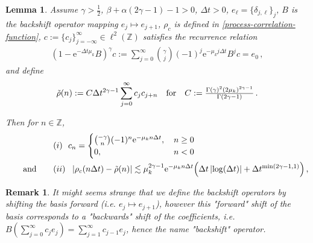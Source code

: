 \documentclass[12pt]{article} %
\newcommand{\abs}[1]{\left| #1 \right|}
\newtheorem{lemma}[theorem]{Lemma}
\newtheorem{remark}{Remark}
\begin{document}
\begin{lemma} \label{lem:toy-model-convergence}  Assume $\gamma>\tfrac12$, $\beta + \alpha (2 \gamma - 1) - 1 > 0$, $\Delta t>0$, %
$e_\ell = \{\delta_{j,\ell}\}_j$, $B$ is the backshift operator mapping $e_j \mapsto e_{j + 1}$, $\rho_c$ is  
defined in \eqref{process-correlation-function}, $c := \{c_j\}_{j = -\infty}^\infty \in \ell^2(\mathbb{Z})$ satisfies the recurrence relation 
\begin{align*}(1 - \mathrm{e}^{-\Delta t \mu_k} B)^{\gamma} c := \sum_{j = 0}^\infty \binom{\gamma}{j} (-1)^j \mathrm{e}^{-\mu_k j\Delta t } B^j c=e_0 \, ,
\end{align*}
and define
\begin{align*}
\Tilde{\rho}(n) := C \Delta t^{2\gamma - 1} \sum_{j = 0}^\infty c_j c_{j + n} \quad \text{for}\quad C := \tfrac{\Gamma(\gamma)^2 (2 \mu_k)^{2 \gamma - 1}}{\Gamma(2 \gamma - 1)}\, .
\end{align*}

Then for $n\in\mathbb Z$,
\begin{align*}
& \qquad (i) \ \ c_n = \begin{cases} \binom{-\gamma}{n} (-1)^n \mathrm{e}^{-\mu_k n  \Delta t }, \, & n \geq 0 \\
0, & n < 0
\end{cases} \\
\qquad\text{and} & \qquad %
(ii) \ \ \abs{\rho_c( n\Delta t ) - \Tilde{\rho}(n)} \lesssim \mu_k^{2 \gamma - 1} \mathrm{e}^{- \mu_k  n\Delta t } \Big( \Delta t \abs{\log(\Delta t)} + \Delta t^{\min(2\gamma - 1, 1)} \Big) \, ,
\end{align*}
\end{lemma}
\begin{remark} It might seems strange that we define the backshift operators by shifting the basis forward (i.e. $e_j \mapsto e_{j + 1}$), however this "forward" shift of the basis corresponds to a "backwards" shift of the coefficients, i.e. $B\left( \sum_{j = 0}^\infty c_j e_j \right) = \sum_{j = 1}^\infty c_{j - 1} e_j$, hence the name "backshift" operator. 
\end{remark}
\end{document}

